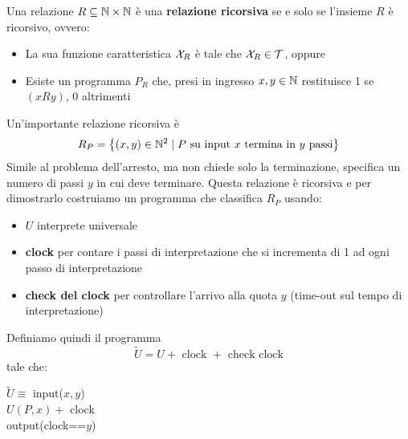 Una relazione $R \subseteq \mathbb{N} \times \mathbb{N}$ è una \textbf{relazione ricorsiva} se e solo se l'insieme $R$ è ricorsivo, ovvero:
\begin{itemize}
	\item La sua funzione caratteristica $\mathcal{X}_R$ è tale che $\mathcal{X}_R \in \mathcal{T}$, oppure
    
	\item Esiste un programma $P_R$ che, presi in ingresso $x,y \in \mathbb{N}$ restituisce 1 se $(xRy)$, 0 altrimenti
\end{itemize}

Un'importante relazione ricorsiva è
$$ R_P = \left\{(x,y) \in \mathbb{N}^2 \mid P \text{ su input } x \text{ termina in } y \text{ passi}\right\} $$
Simile al problema dell'arresto, ma non chiede solo la terminazione, specifica un numero di passi $y$ in cui deve terminare. Questa relazione è ricorsiva e per dimostrarlo costruiamo un programma che classifica $R_P$ usando:
\begin{itemize}
	\item $U$ interprete universale
    
	\item \textbf{clock} per contare i passi di interpretazione che si incrementa di 1 ad ogni passo di interpretazione
	
    \item \textbf{check del clock} per controllare l'arrivo alla quota $y$ (time-out sul tempo di interpretazione)
\end{itemize}

Definiamo quindi il programma
$$ \tilde U = U + \text{ clock } + \text{ check clock}$$
tale che:
\begin{center}
	\begin{minipage}{.85\textwidth}
		\begin{tcolorbox}[colback=white,sharp corners,boxrule=.3mm]
\begin{algorithm}[H]
    \SetAlgoNoEnd
    \SetInd{1em}{1em}

    $\tilde U \equiv$ input($x,y$) \\
    $U(P,x) + $ clock \\
    output(clock==$y$) \\
\end{algorithm}

		\end{tcolorbox}
	\end{minipage}
\end{center}

